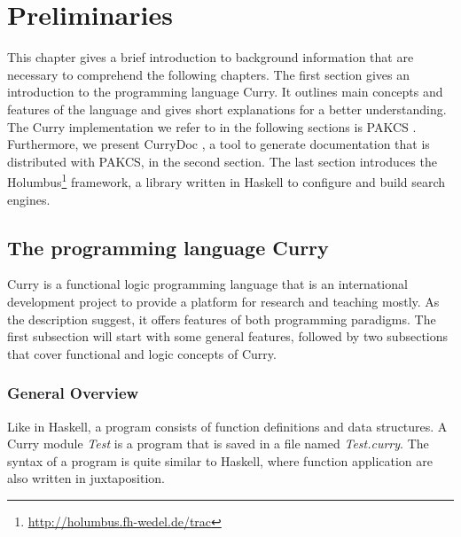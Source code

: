 \documentclass[%
	latex,%
	a4paper,%
	oneside,%
	chapterprefix,%
	headsepline,%
	12pt%
]{scrbook}
\begin{document}
\chapter{Preliminaries}\label{preliminaries}
This chapter gives a brief introduction to background information that
are necessary to comprehend the following chapters. %
The first section gives an introduction to the programming language
Curry. %
It outlines main concepts and features of the language and gives short
explanations for a better understanding. %
The Curry implementation we refer to in the following sections is
PAKCS \cite{pakcs}. Furthermore, we present CurryDoc \cite{currydoc2}, a
tool to generate documentation that is distributed with PAKCS, in the
second section. %
The last section introduces the Holumbus\footnote{\url{http://holumbus.fh-wedel.de/trac}} framework, a
library written in Haskell to configure and build search engines. %

\section{The programming language Curry}\label{preliminaries:curry}


Curry is a functional logic programming language that is an
international development project to provide a platform for research
and teaching mostly. %
As the description suggest, it offers features of both programming
paradigms. %
The first subsection will start with some general features, followed
by two subsections that cover functional and logic concepts of
Curry. %

\subsection{General Overview}
Like in Haskell, a program consists of function definitions and data
structures. %
A Curry module \emph{Test} is a program that is saved in a file named
\emph{Test.curry}. %
The syntax of a program is quite similar to Haskell, where function
application are also written in juxtaposition. %
\end{document}
